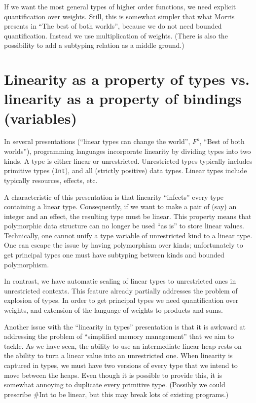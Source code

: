 \documentclass[11pt]{article}
\begin{document}
If we want the most general types of higher order functions, we need
explicit quantification over weights. Still, this is somewhat simpler
that what Morris presents in ``The best of both worlds'', because we
do not need bounded quantification. Instead we use multiplication of
weights. (There is also the possibility to add a subtyping relation as
a middle ground.)

\section{Linearity as a property of types vs. linearity as a property of bindings (variables)}

In several presentations (``linear types can change the world'',
$F^o$, ``Best of both worlds''), programming languages incorporate
linearity by dividing types into two kinds. A type is either linear
or unrestricted. Unrestricted types typically includes primitive types
(\texttt{Int}), and all (strictly positive) data types. Linear types
include typically resources, effects, etc.

A characteristic of this presentation is that linearity ``infects''
every type containing a linear type. Consequently, if we want to make
a pair of (say) an integer and an effect, the resulting type must be
linear. This property means that polymorphic data structure can no
longer be used ``as is'' to store linear values. Technically, one
cannot unify a type variable of unrestricted kind to a linear
type. One can escape the issue by having polymorphism over kinds;
unfortunately to get principal types one must have subtyping between
kinds and bounded polymorphism.

In contrast, we have automatic scaling of linear types to unrestricted
ones in unrestricted contexts. This feature already partially
addresses the problem of explosion of types. In order to get principal
types we need quantification over weights, and extension of the
language of weights to products and sums.

Another issue with the ``linearity in types'' presentation is that it
is awkward at addressing the problem of ``simplified memory
management'' that we aim to tackle. As we have seen, the ability to
use an intermediate linear heap rests on the ability to turn a linear
value into an unrestricted one. When linearity is captured in types,
we must have two versions of every type that we intend to move between
the heaps. Even though it is possible to provide this, it is somewhat
annoying to duplicate every primitive type. (Possibly we could
prescribe \#Int to be linear, but this may break lots of existing
programs.)
\end{document}
